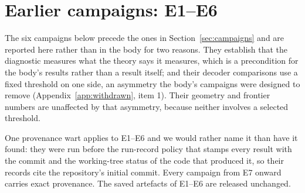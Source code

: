 \section{Earlier campaigns: E1--E6}
\label{app:earlier}

The six campaigns below precede the ones in Section~\ref{sec:campaigns} and are reported here rather
than in the body for two reasons. They establish that the diagnostic measures what the theory says it
measures, which is a precondition for the body's results rather than a result itself; and their
decoder comparisons use a fixed threshold on one side, an asymmetry the body's campaigns were
designed to remove (Appendix~\ref{app:withdrawn}, item 1). Their geometry and frontier numbers are
unaffected by that asymmetry, because neither involves a selected threshold.

One provenance wart applies to E1--E6 and we would rather name it than have it found: they were run
before the run-record policy that stamps every result with the commit and the working-tree status of
the code that produced it, so their records cite the repository's initial commit. Every campaign from
E7 onward carries exact provenance. The saved artefacts of E1--E6 are released unchanged.
